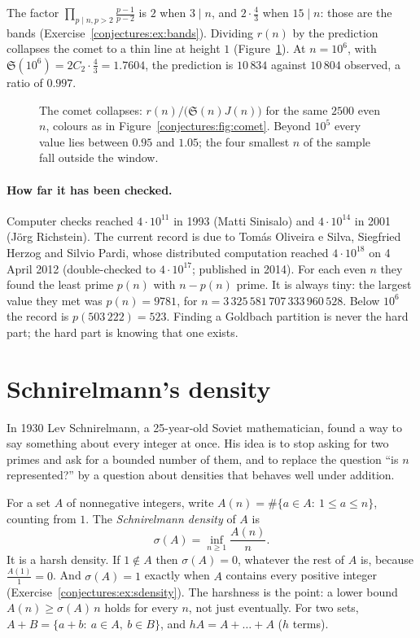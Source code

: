 The factor $\prod_{p\mid n,p>2}\frac{p-1}{p-2}$ is $2$ when $3\mid n$, and $2\cdot\frac43$ when $15\mid n$: those are the bands (Exercise~\ref{conjectures:ex:bands}).
Dividing $r(n)$ by the prediction collapses the comet to a thin line at height $1$ (Figure~\ref{conjectures:fig:normalised}). At $n=10^6$, with
$\mathfrak S(10^6)=2C_2\cdot\frac43=1.7604$, the prediction is $10\,834$ against $10\,804$ observed, a ratio of $0.997$.

\begin{figure}[ht]
\centering
{}
\caption{The comet collapses: $r(n)/\bigl(\mathfrak S(n)J(n)\bigr)$ for the same $2500$ even $n$, colours as in Figure~\ref{conjectures:fig:comet}. Beyond $10^5$ every
value lies between $0.95$ and $1.05$; the four smallest $n$ of the sample fall outside the window.}
\label{conjectures:fig:normalised}
\end{figure}

\paragraph{How far it has been checked.} Computer checks reached $4\cdot10^{11}$ in 1993 (Matti Sinisalo) and $4\cdot10^{14}$ in 2001 (J\"org Richstein). The current record is due to Tom\'as
Oliveira e Silva, Siegfried Herzog and Silvio Pardi, whose distributed computation reached $4\cdot10^{18}$ on 4 April 2012 (double-checked to
$4\cdot10^{17}$; published in 2014). For each even $n$ they found the least prime $p(n)$ with $n-p(n)$ prime. It is always tiny: the largest value they
met was $p(n)=9781$, for $n=3\,325\,581\,707\,333\,960\,528$. Below $10^6$ the record is $p(503\,222)=523$. Finding a Goldbach partition is never the
hard part; the hard part is knowing that one exists.

\section{Schnirelmann's density}

In 1930 Lev Schnirelmann, a 25-year-old Soviet mathematician, found a way to say something about every integer at once. His idea is to stop
asking for two primes and ask for a bounded number of them, and to replace the question ``is $n$ represented?'' by a question about densities that
behaves well under addition.

For a set $A$ of nonnegative integers, write $A(n)=\#\{a\in A:\ 1\le a\le n\}$, counting from $1$. The \emph{Schnirelmann density} of $A$ is
\[
\sigma(A)=\inf_{n\ge1}\frac{A(n)}n.
\]
It is a harsh density. If $1\notin A$ then $\sigma(A)=0$, whatever the rest of $A$ is, because $\frac{A(1)}1=0$. And $\sigma(A)=1$ exactly when $A$ contains every
positive integer (Exercise~\ref{conjectures:ex:sdensity}). The harshness is the point: a lower bound $A(n)\ge\sigma(A)\,n$ holds for every $n$, not just eventually.
For two sets, $A+B=\{a+b:\ a\in A,\ b\in B\}$, and $hA=A+\dots+A$ ($h$ terms).

